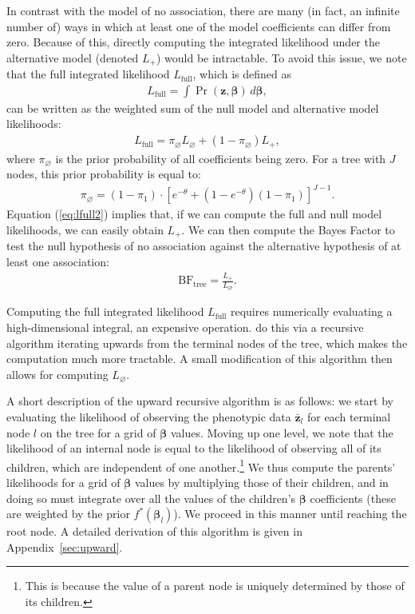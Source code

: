 \documentclass[10pt]{article}
\newcommand{\B}{\symbf{\beta}}
\newcommand{\bz}{\bar{\symbf{z}}}
\begin{document}
In contrast with the model of no association, there are many (in fact, an infinite number of) ways in which at least one of the model coefficients can differ from zero. Because of this, directly computing the integrated likelihood under the alternative model (denoted $L_+$) would be intractable. To avoid this issue, we note that the full integrated likelihood $L_\text{full}$, which is defined as
\begin{align}
  L_\text{full} = \int \Pr( \symbf{z}, \B)\, d\B, \label{eq:lfull1}
\end{align}
can be written as the weighted sum of the null model and alternative model likelihoods:
\begin{align}
  L_\text{full} = \pi_\varnothing L_\varnothing + (1-\pi_\varnothing) L_+, \label{eq:lfull2}
\end{align}
where $\pi_\varnothing$ is the prior probability of all coefficients being zero. For a tree with $J$ nodes, this prior probability is equal to:
\begin{align*}
  \pi_\varnothing = (1-\pi_1) \cdot
  {\left[e^{-\theta} + (1-e^{-\theta})(1-\pi_1)\right]}^{J-1}.
\end{align*}
Equation (\ref{eq:lfull2}) implies that, if we can compute the full and null model likelihoods, we can easily obtain $L_+$. We can then compute the Bayes Factor to test the null hypothesis of no association against the alternative hypothesis of at least one association:
\begin{align*}
  \text{BF}_\text{tree} = \frac{L_+}{L_\varnothing}.
\end{align*}

Computing the full integrated likelihood $L_\text{full}$ requires numerically evaluating a high-dimensional integral, an expensive operation. \cite{Cortes2017} do this via a recursive algorithm iterating upwards from the terminal nodes of the tree, which makes the computation much more tractable. A small modification of this algorithm then allows for computing $L_\varnothing$.

A short description of the upward recursive algorithm is as follows: we start by evaluating the likelihood of observing the phenotypic data $\bz_l$ for each terminal node $l$ on the tree for a grid of $\B$ values. Moving up one level, we note that the likelihood of an internal node is equal to the likelihood of observing all of its children, which are independent of one another.\footnote{This is because the value of a parent node is uniquely determined by those of its children.} We thus compute the parents' likelihoods for a grid of $\B$ values by multiplying those of their children, and in doing so must integrate over all the values of the children's $\B$ coefficients (these are weighted by the prior $f^*(\B_l)$). 
We proceed in this manner until reaching the root node. A detailed derivation of this algorithm is given in Appendix~\ref{sec:upward}.
\end{document}
